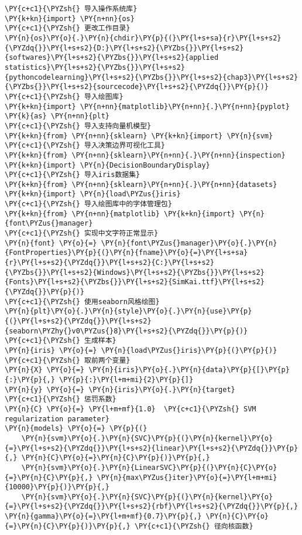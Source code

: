 \begin{Verbatim}[commandchars=\\\{\}]
\PY{c+c1}{\PYZsh{} 导入操作系统库}
\PY{k+kn}{import} \PY{n+nn}{os}
\PY{c+c1}{\PYZsh{} 更改工作目录}
\PY{n}{os}\PY{o}{.}\PY{n}{chdir}\PY{p}{(}\PY{l+s+sa}{r}\PY{l+s+s2}{\PYZdq{}}\PY{l+s+s2}{D:}\PY{l+s+s2}{\PYZbs{}}\PY{l+s+s2}{softwares}\PY{l+s+s2}{\PYZbs{}}\PY{l+s+s2}{applied statistics}\PY{l+s+s2}{\PYZbs{}}\PY{l+s+s2}{pythoncodelearning}\PY{l+s+s2}{\PYZbs{}}\PY{l+s+s2}{chap3}\PY{l+s+s2}{\PYZbs{}}\PY{l+s+s2}{sourcecode}\PY{l+s+s2}{\PYZdq{}}\PY{p}{)}
\PY{c+c1}{\PYZsh{} 导入绘图库}
\PY{k+kn}{import} \PY{n+nn}{matplotlib}\PY{n+nn}{.}\PY{n+nn}{pyplot} \PY{k}{as} \PY{n+nn}{plt}
\PY{c+c1}{\PYZsh{} 导入支持向量机模型}
\PY{k+kn}{from} \PY{n+nn}{sklearn} \PY{k+kn}{import} \PY{n}{svm}
\PY{c+c1}{\PYZsh{} 导入决策边界可视化工具}
\PY{k+kn}{from} \PY{n+nn}{sklearn}\PY{n+nn}{.}\PY{n+nn}{inspection} \PY{k+kn}{import} \PY{n}{DecisionBoundaryDisplay}
\PY{c+c1}{\PYZsh{} 导入iris数据集}
\PY{k+kn}{from} \PY{n+nn}{sklearn}\PY{n+nn}{.}\PY{n+nn}{datasets} \PY{k+kn}{import} \PY{n}{load\PYZus{}iris}
\PY{c+c1}{\PYZsh{} 导入绘图库中的字体管理包}
\PY{k+kn}{from} \PY{n+nn}{matplotlib} \PY{k+kn}{import} \PY{n}{font\PYZus{}manager}
\PY{c+c1}{\PYZsh{} 实现中文字符正常显示}
\PY{n}{font} \PY{o}{=} \PY{n}{font\PYZus{}manager}\PY{o}{.}\PY{n}{FontProperties}\PY{p}{(}\PY{n}{fname}\PY{o}{=}\PY{l+s+sa}{r}\PY{l+s+s2}{\PYZdq{}}\PY{l+s+s2}{C:}\PY{l+s+s2}{\PYZbs{}}\PY{l+s+s2}{Windows}\PY{l+s+s2}{\PYZbs{}}\PY{l+s+s2}{Fonts}\PY{l+s+s2}{\PYZbs{}}\PY{l+s+s2}{SimKai.ttf}\PY{l+s+s2}{\PYZdq{}}\PY{p}{)}
\PY{c+c1}{\PYZsh{} 使用seaborn风格绘图}
\PY{n}{plt}\PY{o}{.}\PY{n}{style}\PY{o}{.}\PY{n}{use}\PY{p}{(}\PY{l+s+s2}{\PYZdq{}}\PY{l+s+s2}{seaborn\PYZhy{}v0\PYZus{}8}\PY{l+s+s2}{\PYZdq{}}\PY{p}{)}
\PY{c+c1}{\PYZsh{} 生成样本}
\PY{n}{iris} \PY{o}{=} \PY{n}{load\PYZus{}iris}\PY{p}{(}\PY{p}{)}
\PY{c+c1}{\PYZsh{} 取前两个变量}
\PY{n}{X} \PY{o}{=} \PY{n}{iris}\PY{o}{.}\PY{n}{data}\PY{p}{[}\PY{p}{:}\PY{p}{,} \PY{p}{:}\PY{l+m+mi}{2}\PY{p}{]}
\PY{n}{y} \PY{o}{=} \PY{n}{iris}\PY{o}{.}\PY{n}{target}
\PY{c+c1}{\PYZsh{} 惩罚系数}
\PY{n}{C} \PY{o}{=} \PY{l+m+mf}{1.0}  \PY{c+c1}{\PYZsh{} SVM regularization parameter}
\PY{n}{models} \PY{o}{=} \PY{p}{(}
    \PY{n}{svm}\PY{o}{.}\PY{n}{SVC}\PY{p}{(}\PY{n}{kernel}\PY{o}{=}\PY{l+s+s2}{\PYZdq{}}\PY{l+s+s2}{linear}\PY{l+s+s2}{\PYZdq{}}\PY{p}{,} \PY{n}{C}\PY{o}{=}\PY{n}{C}\PY{p}{)}\PY{p}{,}
    \PY{n}{svm}\PY{o}{.}\PY{n}{LinearSVC}\PY{p}{(}\PY{n}{C}\PY{o}{=}\PY{n}{C}\PY{p}{,} \PY{n}{max\PYZus{}iter}\PY{o}{=}\PY{l+m+mi}{10000}\PY{p}{)}\PY{p}{,}
    \PY{n}{svm}\PY{o}{.}\PY{n}{SVC}\PY{p}{(}\PY{n}{kernel}\PY{o}{=}\PY{l+s+s2}{\PYZdq{}}\PY{l+s+s2}{rbf}\PY{l+s+s2}{\PYZdq{}}\PY{p}{,} \PY{n}{gamma}\PY{o}{=}\PY{l+m+mf}{0.7}\PY{p}{,} \PY{n}{C}\PY{o}{=}\PY{n}{C}\PY{p}{)}\PY{p}{,} \PY{c+c1}{\PYZsh{} 径向核函数}

\end{Verbatim}
